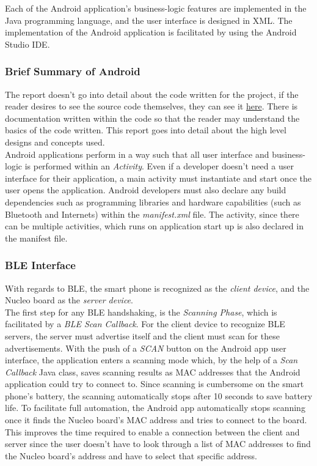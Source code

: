 Each of the Android application's business-logic features are implemented in the Java programming language, and the user interface is designed in XML. The implementation of the Android application is facilitated by using the Android Studio IDE.\\

\subsubsection{Brief Summary of Android}

The report doesn't go into detail about the code written for the project, if the reader desires to see the source code themselves, they can see it \href{https://github.com/lebrice/MicroP/tree/master/project}{here}. There is documentation written within the code so that the reader may understand the basics of the code written. This report goes into detail about the high level designs and concepts used.\\

Android applications perform in a way such that all user interface and business-logic is performed within an \textit{Activity}. Even if a developer doesn't need a user interface for their application, a main activity must instantiate and start once the user opens the application. Android developers must also declare any build dependencies such as programming libraries and hardware capabilities (such as Bluetooth and Internets) within the \textit{manifest.xml} file. The activity, since there can be multiple activities, which runs on application start up is also declared in the manifest file.\\

\subsubsection{BLE Interface}
\label{section:ble_interface}
With regards to BLE, the smart phone is recognized as the \textit{client device}, and the Nucleo board as the \textit{server device}.\\ 

The first step for any BLE handshaking, is the \textit{Scanning Phase}, which is facilitated by a \textit{BLE Scan Callback}. For the client device to recognize BLE servers, the server must advertise itself and the client must scan for these advertisements. With the push of a \textit{SCAN} button on the Android app user interface, the application enters a scanning mode which, by the help of a \textit{Scan Callback} Java class, saves scanning results as MAC addresses that the Android application could try to connect to. Since scanning is cumbersome on the smart phone's battery, the scanning automatically stops after 10 seconds to save battery life. To facilitate full automation, the Android app automatically stops scanning once it finds the Nucleo board's MAC address and tries to connect to the board. This improves the time required to enable a connection between the client and server since the user doesn't have to look through a list of MAC addresses to find the Nucleo board's address and have to select that specific address.\\

